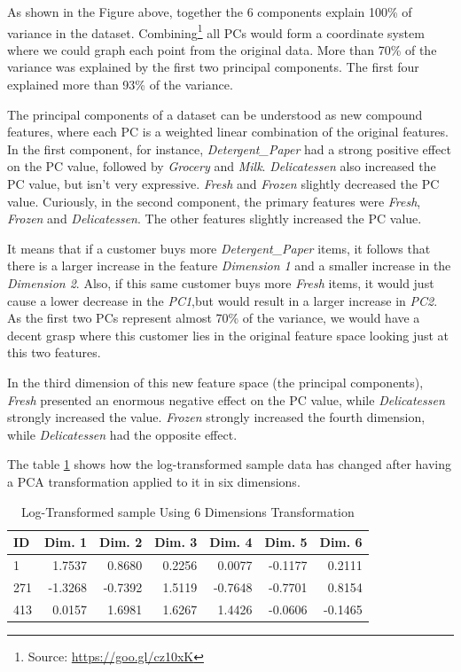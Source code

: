 \documentclass[a4paper]{article}
\begin{document}
As shown in the Figure above, together the 6 components explain 100\% of variance in the dataset. Combining\footnote{Source: \url{https://goo.gl/cz10xK}} all PCs would form a coordinate system where we could graph each point from the original data. More than 70\% of the variance was explained by the first two principal components. The first four explained more than 93\% of the variance.

The principal components of a dataset can be understood as new compound features, where each PC is a weighted linear combination of the original features. In the first component, for instance, \textit{Detergent\_Paper} had a strong positive effect on the PC value, followed by \textit{Grocery} and \textit{Milk}. \textit{Delicatessen} also increased the PC value, but isn't very expressive. \textit{Fresh} and \textit{Frozen} slightly decreased the PC value. Curiously, in the second component, the primary features were \textit{Fresh}, \textit{Frozen} and \textit{Delicatessen}. The other features slightly increased the PC value.

It means that if a customer buys more \textit{Detergent\_Paper} items, it follows that there is a larger increase in the feature \textit{Dimension 1} and a smaller increase in the \textit{Dimension 2}. Also, if this same customer buys more \textit{Fresh} items, it would just cause a lower decrease in the \textit{PC1},but would result in a larger increase in \textit{PC2}. As the first two PCs represent almost 70\% of the variance, we would have a decent grasp where this customer lies in the original feature space looking just at this two features.

In the third dimension of this new feature space (the principal components), \textit{Fresh} presented an enormous negative effect on the PC value, while \textit{Delicatessen} strongly increased the value. \textit{Frozen} strongly increased the fourth dimension, while \textit{Delicatessen} had the opposite effect.

The table \ref{tab:sample_transformed_1} shows how the log-transformed sample data has changed after having a PCA transformation applied to it in six dimensions.

\begin{table}[ht!]
\centering
\begin{tabular}{l|rrrrrr}
{ID} &  Dim. 1 &  Dim. 2 &  Dim. 3 &  Dim. 4 &  Dim. 5 &  Dim. 6 \\\hline
1   &       1.7537 &       0.8680 &       0.2256 &       0.0077 &      -0.1177 &       0.2111 \\
271 &      -1.3268 &      -0.7392 &       1.5119 &      -0.7648 &      -0.7701 &       0.8154 \\
413 &       0.0157 &       1.6981 &       1.6267 &       1.4426 &      -0.0606 &      -0.1465 \\

\end{tabular}
\caption{\label{tab:sample_transformed_1}Log-Transformed sample Using 6 Dimensions Transformation}
\end{table}
\end{document}

